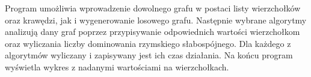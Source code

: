Program umożliwia wprowadzenie dowolnego grafu w postaci listy wierzchołków oraz krawędzi, jak i wygenerowanie losowego grafu. Następnie wybrane algorytmy analizują dany graf poprzez przypisywanie odpowiednich wartości wierzchołkom oraz wyliczania liczby dominowania rzymskiego słabospójnego. Dla każdego z algorytmów wyliczany i zapisywany jest ich czas działania. Na końcu program wyświetla wykres z nadanymi wartościami na wierzchołkach. 


